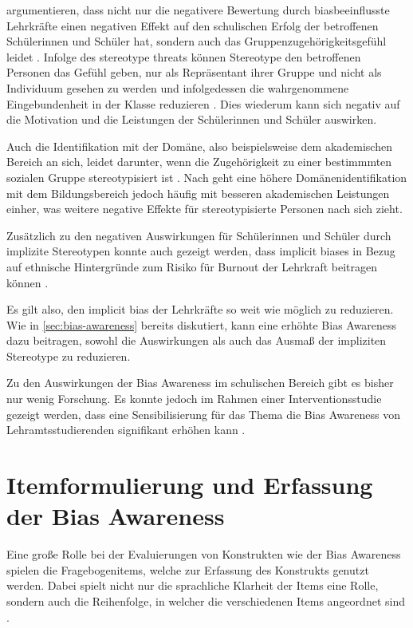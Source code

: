  argumentieren, dass nicht nur die negativere Bewertung durch biasbeeinflusste Lehrkräfte einen negativen Effekt auf den schulischen Erfolg der betroffenen Schülerinnen und Schüler hat, sondern auch das Gruppenzugehörigkeitsgefühl leidet \citep{martiny2020theoretischer}.
Infolge des stereotype threats können Stereotype den betroffenen Personen das Gefühl geben, nur als Repräsentant ihrer Gruppe und nicht als Individuum gesehen zu werden und infolgedessen die wahrgenommene Eingebundenheit in der Klasse reduzieren \citep{walton2012social}.
Dies wiederum kann sich negativ auf die Motivation und die Leistungen der Schülerinnen und Schüler auswirken.

Auch die Identifikation mit der Domäne, also beispielsweise dem akademischen Bereich an sich, leidet darunter, wenn die Zugehörigkeit zu einer bestimmmten sozialen Gruppe stereotypisiert ist \citep{crocker1989social}.
Nach \citet{osborne2011identification} geht eine höhere Domänenidentifikation mit dem Bildungsbereich jedoch häufig mit besseren akademischen Leistungen einher, was weitere negative Effekte für stereotypisierte Personen nach sich zieht.

Zusätzlich zu den negativen Auswirkungen für Schülerinnen und Schüler durch implizite Stereotypen konnte auch gezeigt werden, dass implicit biases in Bezug auf ethnische Hintergründe zum Risiko für Burnout der Lehrkraft beitragen können \citep{costa2023does}.

Es gilt also, den implicit bias der Lehrkräfte so weit wie möglich zu reduzieren.
Wie in \autoref{sec:bias-awareness} bereits diskutiert, kann eine erhöhte Bias Awareness dazu beitragen, sowohl die Auswirkungen als auch das Ausmaß der impliziten Stereotype zu reduzieren.

Zu den Auswirkungen der Bias Awareness im schulischen Bereich gibt es bisher nur wenig Forschung.
Es konnte jedoch im Rahmen einer Interventionsstudie gezeigt werden, dass eine Sensibilisierung für das Thema die Bias Awareness von Lehramtsstudierenden signifikant erhöhen kann \citep{bonefeld2022reflexion}.


\section{Itemformulierung und Erfassung der Bias Awareness}
\label{sec:itemformulierung}

Eine große Rolle bei der Evaluierungen von Konstrukten wie der Bias Awareness spielen die Fragebogenitems, welche zur Erfassung des Konstrukts genutzt werden.
Dabei spielt nicht nur die sprachliche Klarheit der Items eine Rolle, sondern auch die Reihenfolge, in welcher die verschiedenen Items angeordnet sind \citep[S.~675ff.]{baur2014handbuch}.

